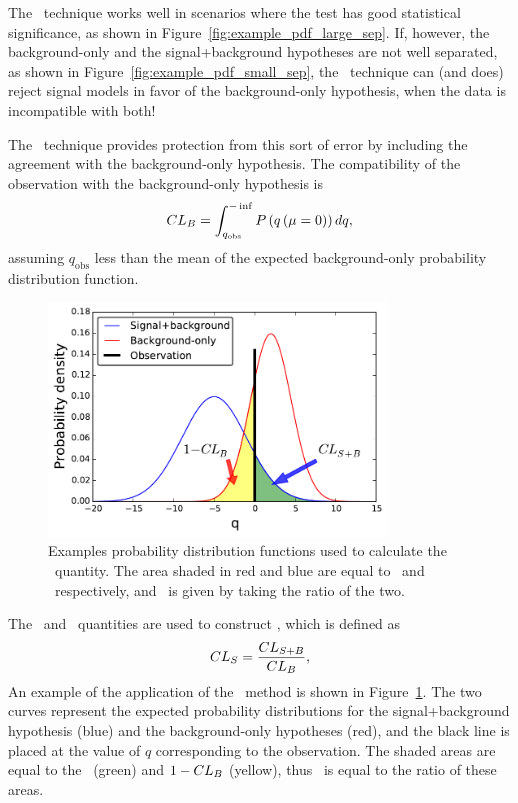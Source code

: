 The \clsb\ technique works well in scenarios where the test has good
statistical significance, as shown in Figure~\ref{fig:example_pdf_large_sep}.
If, however, the background-only and the signal+background hypotheses are not
well separated, as shown in Figure~\ref{fig:example_pdf_small_sep}, the
\clsb\ technique can (and does) reject signal models in favor of the
background-only hypothesis, when the data is incompatible with both!

The \cls\ technique provides protection from this sort of error by including
the agreement with the background-only hypothesis.
The compatibility of the observation with the background-only hypothesis is
\begin{equation}
  CL_{B} = \int_{q_\mathrm{obs}}^{-\inf} P\left(q\left(\mu=0\right)\right) dq,
\end{equation}
assuming $q_\mathrm{obs}$ less than the mean of the expected background-only
probability distribution function.

\begin{figure}[t]
  \centering
  \includegraphics[width=0.80\textwidth]{figs/stats/cls.pdf}
  \caption[
    Examples probability distribution functions used to calculate the
    \cls\ quantity.
  ]{
    Examples probability distribution functions used to calculate the
    \cls\ quantity.
    The area shaded in red and blue are equal to \clb\ and \clsb\ respectively,
    and \cls\ is given by taking the ratio of the two.
  }
  \label{fig:cls}
\end{figure}

The \clsb\ and \clb\ quantities are used to construct \cls, which is defined as
\begin{equation}
  CL_{S} = \frac{CL_{S+B}}{CL_{B}},
\end{equation}
An example of the application of the \cls\ method is shown in
Figure~\ref{fig:cls}.
The two curves represent the expected probability distributions for the
signal+background hypothesis (blue) and the background-only hypotheses (red),
and the black line is placed at the value of $q$ corresponding to the
observation.
The shaded areas are equal to the \clsb\ (green) and $1-CL_{B}$ (yellow), thus
\cls\ is equal to the ratio of these areas.

